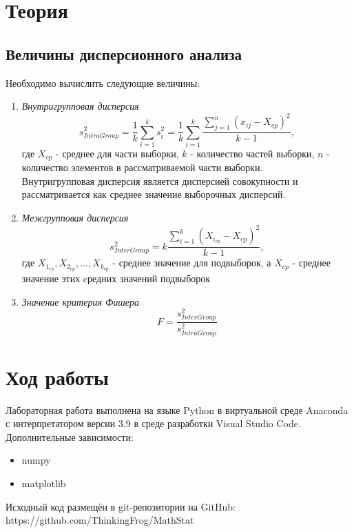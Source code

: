 \documentclass[12pt,a4paper]{article}
\begin{document}
\section{Теория}
\subsection{Величины дисперсионного анализа}
Необходимо вычислить следующие величины:
\begin{enumerate}
    \item \textit{Внутригрупповая дисперсия}
        \begin{equation}
            s_{IntraGroup}^2=\frac{1}{k}\sum_{i=1}^ks_i^2=\frac{1}{k}\sum_{i=1}^k\frac{\sum_{j=1}^n(x_{ij}-X_{cp})^2}{k-1},
        \end{equation}
        где $X_{cp}$ - среднее для части выборки, $k$ - количество частей выборки, $n$ - количество элементов в рассматриваемой части выборки.\\Внутригрупповая дисперсия является дисперсией совокупности и рассматривается как среднее значение выборочных дисперсий.
    \item \textit{Межгрупповая дисперсия}
        \begin{equation}
            s_{InterGroup}^2=k\frac{\sum_{i=1}^k(X_{i_{cp}}-X_{cp})^2}{k-1},
        \end{equation}
        где $X_{1_{cp}},X_{2_{cp}},...,X_{k_{cp}}$ - среднее значение для подвыборок, а $X_{cp}$ - среднее значение этих cредних значений подвыборок
    \item \textit{Значение критерия Фишера}
        \begin{equation}
            F=\frac{s_{InterGroup}^2}{s_{IntraGroup}^2}
        \end{equation}
\end{enumerate}

\section{Ход работы}
Лабораторная работа выполнена на языке Python в виртуальной среде Anaconda с интерпретатором версии 3.9 в среде разработки Visual Studio Code. Дополнительные зависимости:
\begin{itemize}
    \item numpy
    \item matplotlib
\end{itemize}

Исходный код размещён в git-репозитории на GitHub: \\ https://github.com/ThinkingFrog/MathStat
\end{document}
